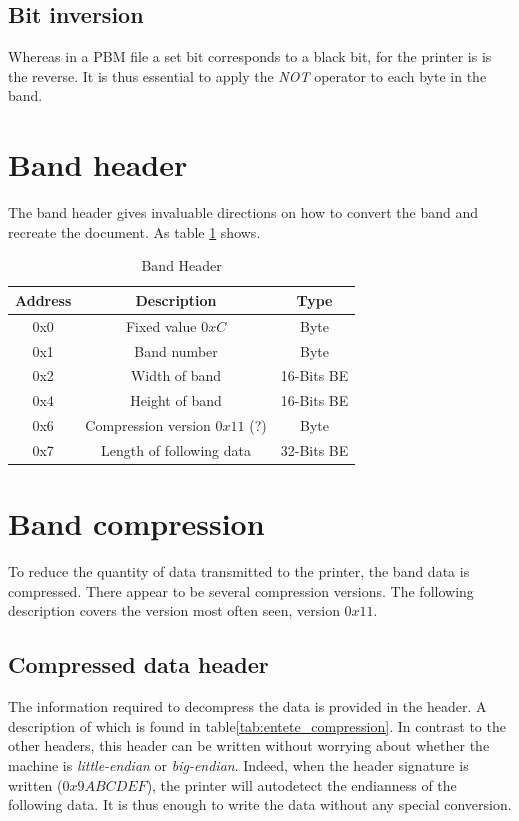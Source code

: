 \subsection{Bit inversion}
Whereas in a PBM file a set bit corresponds to a black bit, for the
printer is is the reverse.
It is thus essential to apply the \emph{NOT} operator to each byte in the band.

\section{Band header}

The band header gives invaluable directions on how to convert
the band and recreate the document. As table 
\ref{tab:entete_bande} shows.

\begin{table}[!ht]
\centering
\begin{tabular}{| c | c | c |}
\hline
\textbf{Address} & \textbf{Description} & \textbf{Type} \\
\hline
\hline
0x0 & Fixed value $0xC$ & Byte \\
0x1 & Band number & Byte \\
0x2 & Width of band & 16-Bits BE \\
0x4 & Height of band & 16-Bits BE \\
0x6 & Compression version $0x11$ (?) & Byte \\
0x7 & Length of following data & 32-Bits BE \\
\hline
\end{tabular}
\caption{Band Header}
\label{tab:entete_bande}
\end{table}

\section{Band compression}
To reduce the quantity of data transmitted to the printer, the band data is compressed. There
appear to be several compression versions. The following description covers the
version most often seen, version \textsc{$0x11$}.

\subsection{Compressed data header}
The  information required to decompress the data is
provided in the header.  A description of which is found
in table\ref{tab:entete_compression}.
In contrast to the other headers, this header can be written
without worrying about whether the machine is 
\emph{little-endian} or \emph{big-endian}. Indeed, when the header 
signature is written ($0x9ABCDEF$), the printer will autodetect 
the endianness of the following 
data. It is thus enough to write the data without any special conversion.

